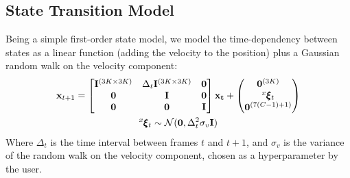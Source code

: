 \documentclass[sigconf, nonacm]{acmart}
\begin{document}
\subsection{State Transition Model}
Being a simple first-order state model, we model the time-dependency between states as a linear function (adding the velocity to the position) plus a Gaussian random walk on the velocity component:
\begin{gather*}
    \mathbf{x}_{t+1} = \begin{bmatrix}
        \mathbf{I}^{(3K \times 3K)} & \Delta_t\mathbf{I}^{(3K \times 3K)} & \mathbf{0} \\
        \mathbf{0} & \mathbf{I} & \mathbf{0}\\
        \mathbf{0} &  \mathbf{0} & \mathbf{I}\\
    \end{bmatrix} \mathbf{x_t} + \begin{pmatrix}
        \mathbf{0}^{(3K)}\\
        \prescript{x}{}{}\pmb{\xi}_t\\
        \mathbf{0}^{(7(C-1) + 1)}
    \end{pmatrix}\\
    \prescript{x}{}{}\pmb{\xi}_t \sim \mathcal{N}(\mathbf{0}, \Delta_t^2\sigma_v \mathbf{I})
\end{gather*}
Where $\Delta_t$ is the time interval between frames $t$ and $t+1$, and $\sigma_v$ is the variance of the random walk on the velocity component, chosen as a hyperparameter by the user. \par
\end{document}
